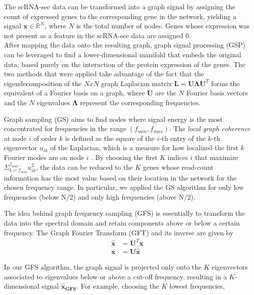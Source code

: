 \documentclass[10pt,conference,compsocconf]{IEEEtran}
\begin{document}
The scRNA-sec data can be transformed into a graph signal by assigning the count of expressed genes to the corresponding gene in the network, yielding a signal $\boldsymbol{x} \in \mathbb{R}^N$, where $N$ is the total number of nodes. Genes whose expression was not present as a feature in the scRNA-sec data are assigned 0. \\
After mapping the data onto the resulting graph, graph signal processing (GSP) can be leveraged to find a lower-dimensional manifold that embeds the original data, based purely on the interaction of the protein expression of the genes. The two methods that were applied take advantage of the fact that the eigendecomposition of the $N x N$ graph Laplacian matrix $\boldsymbol{L} = \boldsymbol{U\Lambda U}^T$ forms the equivalent of a Fourier basis on a graph, where $\boldsymbol{U}$ are the $N$ Fourier basis vectors and the $N$ eigenvalues $\boldsymbol{\Lambda}$ represent the corresponding frequencies.
 \par
Graph sampling (GS) aims to find nodes where signal energy is the most concentrated for frequencies in the range $(f_{min}, f_{max})$. The \textit{local graph coherence} at node $i$ of order $k$ is defined as the square of the $i$-th entry of the $k$-th eigenvector $u_{ik}$ of the Laplacian, which is a measure for how localized the first $k$ Fourier modes are on node $i$ \cite{Puy2018}. By choosing the first $K$ indices $i$ that maximize $\Sigma_{k=f_{min}}^{f_{max}} u_{ik}^2$, the data can be reduced to the $K$ genes whose read-count information has the most value based on their location in the network for the chosen frequency range. In particular, we applied the GS algorithm for only low frequencies (below N/2) and only high frequencies (above N/2). 
\par
The idea behind graph frequency sampling (GFS) is essentially to transform the data into the spectral domain and retain components above or below a certain frequency. The Graph Fourier Transform (GFT) and its inverse are given by
\begin{align*}\label{equ:GFT}
\boldsymbol{\hat{x}} &= \boldsymbol{U}^T \boldsymbol{x}\\
\boldsymbol{x} &= \boldsymbol{U} \boldsymbol{\hat{x}}
\end{align*} 
\par
In our GFS algorithm, the graph signal is projected only onto the $K$ eigenvectors associated to eigenvalues below or above a cut-off frequency, resulting in a $K$-dimensional signal $\boldsymbol{\hat{x}_{GFS}}$. For example, choosing the $K$ lowest frequencies,
\end{document}

